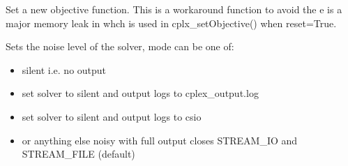 \documentclass[letterpaper,10pt,english]{sphinxmanual}
\begin{document}

\begin{fulllineitems}
\label{\detokenize{modules_doc:cbmpy.CBCPLEX.cplx_setObjective2}}
\pysigstartsignatures
{}
\pysigstopsignatures
\sphinxAtStartPar
Set a new objective function. This is a workaround function to avoid the
e is a major memory leak in  whch is used
in cplx\_setObjective()  when reset=True.

\end{fulllineitems}


\begin{fulllineitems}
\label{\detokenize{modules_doc:cbmpy.CBCPLEX.cplx_setOutputStreams}}
\pysigstartsignatures
{}
\pysigstopsignatures
\sphinxAtStartPar
Sets the noise level of the solver, mode can be one of:
\begin{itemize}
\item {} 
\sphinxAtStartPar
{} silent i.e. no output

\item {} 
\sphinxAtStartPar
{} set solver to silent and output logs to  cplex\_output.log

\item {} 
\sphinxAtStartPar
{} set solver to silent and output logs to  csio

\item {} 
\sphinxAtStartPar
{} or anything else noisy with full output closes STREAM\_IO and STREAM\_FILE (default)

\end{itemize}

\end{fulllineitems}
\end{document}

